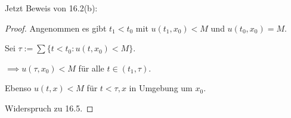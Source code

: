  Jetzt Beweis von 16.2(b):

 \begin{proof}
   Angenommen es gibt $t_1 < t_0$ mit $u(t_1, x_0) < M$ und $u(t_0, x_0) = M$.

   Sei $\tau := \sum\{ t < t_0 \colon u(t, x_0) < M\}$.

   $\implies u(\tau, x_0) < M$ für alle $t \in (t_1, \tau).$

   Ebenso $u(t, x) < M$ für $t < \tau, x$ in Umgebung um $x_0$.

   Widerspruch zu 16.5.
 \end{proof}


